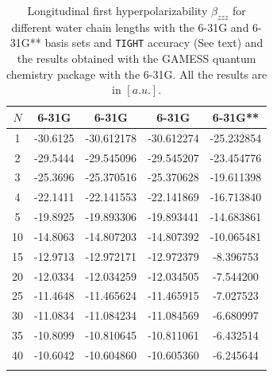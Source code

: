 \documentclass[prl,aps,twocolumn,showpacs,twocolumngrid,superbib]{revtex4}
\begin{document}
\begin{table}
  \centering
  \caption{\protect
    Longitudinal first hyperpolarizability $\beta_{zzz}$
    for different water chain lengths with the 6-31G and 6-31G** basis sets
    and {\tt TIGHT} accuracy (See text) and the results obtained with
    the GAMESS quantum chemistry package \cite{gamess} with the 6-31G. 
    All the results are in $[a.u.]$.
  }\label{tab:Beta_1D_Values}
  \begin{tabular}{ccccc}
    \toprule
    $N$ &\multicolumn{1}{c}{6-31G\footnotemark[1]}
    &\multicolumn{1}{c}{6-31G\footnotemark[2]}
    &\multicolumn{1}{c}{6-31G\footnotemark[2]\footnotemark[3]}
    &\multicolumn{1}{c}{6-31G**\footnotemark[2]}\\
    \hline
    1 & -30.6125 & -30.612178 & -30.612274 & -25.232854 \\
    2 & -29.5444 & -29.545096 & -29.545207 & -23.454776 \\
    3 & -25.3696 & -25.370516 & -25.370628 & -19.611398 \\
    4 & -22.1411 & -22.141553 & -22.141869 & -16.713840 \\
    5 & -19.8925 & -19.893306 & -19.893441 & -14.683861 \\
    10 & -14.8063 & -14.807203 & -14.807392 & -10.065481 \\
    15 & -12.9713 & -12.972171 & -12.972379 &  -8.396753 \\
    20 & -12.0334 & -12.034259 & -12.034505 &  -7.544200 \\
    25 & -11.4648 & -11.465624 & -11.465915 &  -7.027523 \\
    30 & -11.0834 & -11.084234 & -11.084569 &  -6.680997 \\
    35 & -10.8099 & -10.810645 & -10.811061 &  -6.432514 \\
    40 & -10.6042 & -10.604860 & -10.605360 &  -6.245644 \\
    \botrule
  \end{tabular}
\end{table}
\end{document}
